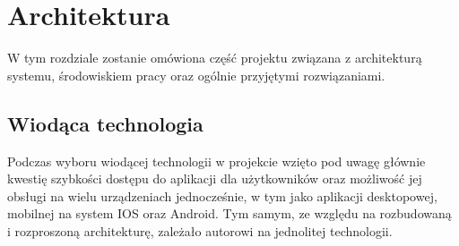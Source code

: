 \chapter{Architektura}
\label{ch:architektura}

W tym rozdziale zostanie omówiona część projektu związana z architekturą systemu, środowiskiem pracy oraz ogólnie przyjętymi rozwiązaniami.

\section{Wiodąca technologia}

Podczas wyboru wiodącej technologii w projekcie wzięto pod uwagę głównie kwestię szybkości dostępu do aplikacji dla użytkowników oraz możliwość jej obsługi na wielu urządzeniach jednocześnie, w tym jako aplikacji desktopowej, mobilnej na system IOS oraz Android. Tym samym, ze względu na rozbudowaną i rozproszoną architekturę, zależało autorowi na jednolitej technologii.

